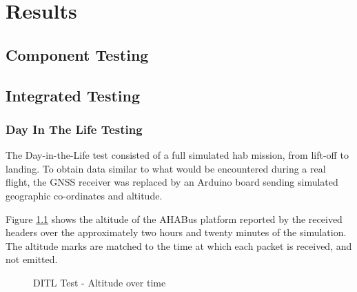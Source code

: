 \chapter{Results}
\label{ch:results}

\section{Component Testing}

\section{Integrated Testing}

\subsection{Day In The Life Testing}
\label{ssec:results-ditl}

The Day-in-the-Life test consisted of a full simulated \acrlong{hab} mission,
from lift-off to landing. To obtain data similar to what would be encountered
during a real flight, the GNSS receiver was replaced by an Arduino board 
sending simulated geographic co-ordinates and altitude.

Figure \ref{fig:dit-alt} shows the altitude of the AHABus platform reported by
the received headers over the approximately two hours and twenty minutes of the
simulation. The altitude marks are matched to the time at which each packet
is received, and not emitted.

\begin{figure}[H]
\centering
\caption{DITL Test - Altitude over time}
\label{fig:dit-alt}
\end{figure}

%

